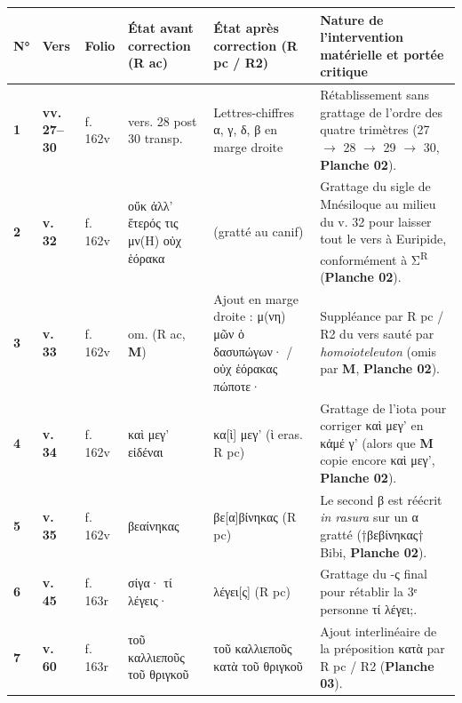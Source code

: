 \documentclass[11pt, a4paper, twoside]{article}
\renewcommand{\_}{\origunderscore\penalty0\relax}
\renewcommand{\texttt}[1]{#1}
\newcommand{\Rac}{\textbf{R}\textsuperscript{ac}}
\newcommand{\Rpc}{\textbf{R}\textsuperscript{pc}}
\newcommand{\Rdeux}{\textbf{R}\textsuperscript{2}}
\newcommand{\M}{\textbf{M}}
\newcommand{\Bibi}{\textit{Bibi}}
\newcommand{\inRas}[2]{[\kern-0.15em[#1]\kern-0.15em]#2}
\newcommand{\expo}[1]{\textsuperscript{#1}}
\newcommand{\auDessus}[2]{\ensuremath{\overset{\text{#2}}{\text{#1}}}}
\def\Rac{R ac}%
\def\Rpc{R pc}%
\def\Rdeux{R2}%
\def\Bibi{Bibi}%
\def\inRas#1#2{[#1]#2}%
\def\auDessus#1#2{#1(#2)}%
\def\expo#1{#1}%
\begin{document}
{\small
\begin{longtable}{@{}>{\raggedright\arraybackslash}p{} >{\raggedright\arraybackslash}p{} >{\raggedright\arraybackslash}p{} >{\raggedright\arraybackslash}p{} >{\raggedright\arraybackslash}p{} >{\raggedright\arraybackslash}p{}@{}}
\toprule
\textbf{N°} & \textbf{Vers} & \textbf{Folio} & \textbf{État avant correction (\Rac{})} & \textbf{État après correction (\Rpc{} / \Rdeux{})} & \textbf{Nature de l'intervention matérielle et portée critique} \\
\midrule
\endhead
\bottomrule
\endfoot
\textbf{1} & \textbf{vv. 27–30} & \texttt{f. 162v} & \texttt{vers. 28 post 30 transp.} & Lettres-chiffres \texttt{α, γ, δ, β} en marge droite & Rétablissement sans grattage de l'ordre des quatre trimètres (\texttt{27 $\to$ 28 $\to$ 29 $\to$ 30}, \textbf{Planche 02}). \\
\addlinespace[3pt]
\textbf{2} & \textbf{v. 32} & \texttt{f. 162v} & \texttt{οὔκ ἀλλ' ἕτερός τις μ\auDessus{ν}{Η} οὐχ ἑόρακα} & \texttt{\inRas{μ\auDessus{ν}{Η}}{}} (gratté au canif) & Grattage du sigle de Mnésiloque au milieu du v. 32 pour laisser tout le vers à Euripide, conformément à Σ\textsuperscript{R} (\textbf{Planche 02}). \\
\addlinespace[3pt]
\textbf{3} & \textbf{v. 33} & \texttt{f. 162v} & \texttt{om.} (\Rac{}, \M{}) & Ajout en marge droite : \texttt{μ(νη) μῶν ὁ δασυπώγων· / οὐχ ἑόρακας πώποτε·} & Suppléance par \Rpc{} / \Rdeux{} du vers sauté par \textit{homoioteleuton} (omis par \M{}, \textbf{Planche 02}). \\
\addlinespace[3pt]
\textbf{4} & \textbf{v. 34} & \texttt{f. 162v} & \texttt{καὶ μεγ' εἰδέναι} & \texttt{κα\inRas{ὶ}{} μεγ'} (\texttt{ὶ eras.} \Rpc{}) & Grattage de l'iota pour corriger \texttt{καὶ μεγ'} en \texttt{κἀμέ γ'} (alors que \M{} copie encore \texttt{καὶ μεγ'}, \textbf{Planche 02}). \\
\addlinespace[3pt]
\textbf{5} & \textbf{v. 35} & \texttt{f. 162v} & \texttt{βεαίνηκας} & \texttt{βε\inRas{α}{β}ίνηκας} (\Rpc{}) & Le second \texttt{β} est réécrit \textit{in rasura} sur un \texttt{α} gratté (\texttt{†βεβίνηκας†} \Bibi{}, \textbf{Planche 02}). \\
\addlinespace[3pt]
\textbf{6} & \textbf{v. 45} & \texttt{f. 163r} & \texttt{σίγα· τί λέγεις·} & \texttt{λέγει\inRas{ς}{}} (\Rpc{}) & Grattage du \texttt{-ς} final pour rétablir la 3ᵉ personne \texttt{τί λέγει;}. \\
\addlinespace[3pt]
\textbf{7} & \textbf{v. 60} & \texttt{f. 163r} & \texttt{τοῦ καλλιεποῦς τοῦ θριγκοῦ} & \texttt{τοῦ καλλιεποῦς \expo{κατὰ} τοῦ θριγκοῦ} & Ajout interlinéaire de la préposition \texttt{κατὰ} par \Rpc{} / \Rdeux{} (\textbf{Planche 03}). \\

\end{longtable}}
\end{document}
